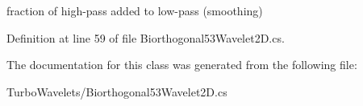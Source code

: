 fraction of high-\/pass added to low-\/pass (smoothing) 



\-Definition at line 59 of file \-Biorthogonal53\-Wavelet2\-D.\-cs.



\-The documentation for this class was generated from the following file\-:\begin{DoxyCompactItemize}
\item 
\-Turbo\-Wavelets/\-Biorthogonal53\-Wavelet2\-D.\-cs\end{DoxyCompactItemize}

